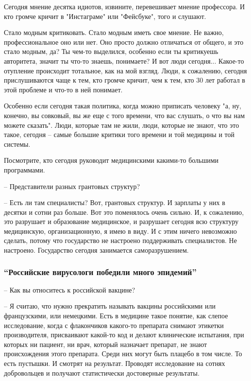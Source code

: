 Сегодня мнение десятка идиотов, извините, перевешивает мнение профессора. И кто
громче кричит в "Инстаграме" или "Фейсбуке", того и слушают.

Стало модным критиковать. Стало модным иметь свое мнение. Не важно,
профессиональное оно или нет. Оно просто должно отличаться от общего, и это
стало модным, да? Ты чем-то выделился, особенно если ты критикуешь авторитета,
значит ты что-то знаешь, понимаете? И вот люди сегодня... Какое-то отупление
происходит тотальное, как на мой взгляд. Люди, к сожалению, сегодня
прислушиваются чаще к тем, кто громче кричит, чем к тем, кто 30 лет работал в
этой проблеме и что-то в ней понимает.

Особенно если сегодня такая политика, когда можно приписать человеку "а, ну,
конечно, вы совковый, вы же еще с того времени, что вас слушать, о что вы нам
можете сказать". Люди, которые там не жили, люди, которые не знают, что это
такое, сегодня – самые большие критики того времени и той медицины и той
системы.

Посмотрите, кто сегодня руководит медицинскими какими-то большими программами. 

– Представители разных грантовых структур?

– Есть ли там специалисты? Вот, грантовых структур. И зарплаты у них в десятки
и сотни раз больше. Вот это поменялось очень сильно. И, к сожалению, это
разрушает и образование медицинское, и разрушает сегодня всю структуру
медицинскую, организационную, я имею в виду. И с этим ничего невозможно
сделать, потому что государство не настроено поддерживать специалистов. Не
настроено. Государство сегодня занимается саморазрушением. 

\subsubsection{\enquote{Российские вирусологи победили много эпидемий}}

– Как вы относитесь к российской вакцине?

– Я считаю, что нужно прекратить называть вакцины российскими или французскими,
или немецкими. Есть в медицине такое понятие, как слепое исследование, когда с
флакончиков какого-то препарата снимают этикетки производителя, присваивают
какой-то код и делают клинические испытания, при которых ни пациент, ни врач,
который назначает препарат, не знают происхождения этого препарата. Среди них
могут быть плацебо в том числе. То есть пустышки. И смотрят на результат.
Проводят исследование на сотнях добровольцев и получают статистически
достоверные результаты.


